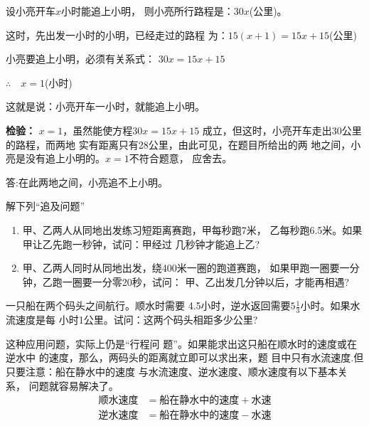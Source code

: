 \begin{solution}    
设小亮开车$x$小时能追上小明，
        则小亮所行路程是：$30x$(公里)。

    这时，先出发一小时的小明，已经走过的路程
为：$15(x+1)=15x + 15$(公里)

    小亮要追上小明，必须有关系式：
            $  30x=15x+15$

$\therefore\quad x= 1$(小时)

    这就是说：小亮开车一小时，就能追上小明。

\textbf{检验：} $x=1$，虽然能使方程$30x =15x + 15$
成立，但这时，小亮开车走出30公里的路程，而两地
实有距离只有28公里，由此可见，在题目所给出的两
地之间，小亮是没有追上小明的。$x=1$不符合题意，
应舍去。

    答:在此两地之间，小亮追不上小明。
\end{solution}


\begin{ex}
    解下列“追及问题”
\begin{enumerate}
    \item 甲、乙两人从同地出发练习短距离赛跑，甲每秒跑7米，
    乙每秒跑6.5米。如果甲让乙先跑一秒钟，试问：甲经过
    几秒钟才能追上乙?
    \item    甲、乙两人同时从同地出发，绕400米一圈的跑道赛跑，
    如果甲跑一圈要一分钟，乙跑一圈要一分零20秒，试问：
    甲、乙出发几分钟以后，才能再相遇?
\end{enumerate}  
\end{ex}



\begin{example}
一只船在两个码头之间航行。顺水时需要
4.5小时，逆水返回需要$5\frac{1}{3}$小时。如果水流速度是每
小时1公里。试问：这两个码头相距多少公里?
\end{example}

\begin{analyze}
    这种应用问题，实际上仍是“行程问
题”。如果能求出这只船在顺水时的速度或在逆水中
的速度，那么，两码头的距离就立即可以求出来，题
目中只有水流速度.但只要注意：船在静水中的速度
与水流速度、逆水速度、顺水速度有以下基本关系，
问题就容易解决了。
\[\begin{split}
    \text{顺水速度}&=\text{船在静水中的速度}+\text{水速}\\
    \text{逆水速度}&=\text{船在静水中的速度}-\text{水速}\\
\end{split}\]    
\end{analyze}

